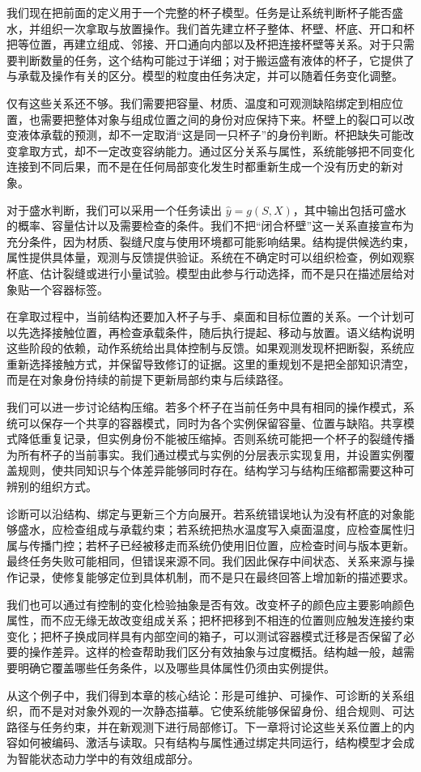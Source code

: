 我们现在把前面的定义用于一个完整的杯子模型。任务是让系统判断杯子能否盛水，并组织一次拿取与放置操作。我们首先建立杯子整体、杯壁、杯底、开口和杯把等位置，再建立组成、邻接、开口通向内部以及杯把连接杯壁等关系。对于只需要判断数量的任务，这个结构可能过于详细；对于搬运盛有液体的杯子，它提供了与承载及操作有关的区分。模型的粒度由任务决定，并可以随着任务变化调整。

仅有这些关系还不够。我们需要把容量、材质、温度和可观测缺陷绑定到相应位置，也需要把整体对象与组成位置之间的身份对应保持下来。杯壁上的裂口可以改变液体承载的预测，却不一定取消“这是同一只杯子”的身份判断。杯把缺失可能改变拿取方式，却不一定改变容纳能力。通过区分关系与属性，系统能够把不同变化连接到不同后果，而不是在任何局部变化发生时都重新生成一个没有历史的新对象。

对于盛水判断，我们可以采用一个任务读出 $\widehat y=g(S,X)$，其中输出包括可盛水的概率、容量估计以及需要检查的条件。我们不把“闭合杯壁”这一关系直接宣布为充分条件，因为材质、裂缝尺度与使用环境都可能影响结果。结构提供候选约束，属性提供具体量，观测与反馈提供验证。系统在不确定时可以组织检查，例如观察杯底、估计裂缝或进行小量试验。模型由此参与行动选择，而不是只在描述层给对象贴一个容器标签。

在拿取过程中，当前结构还要加入杯子与手、桌面和目标位置的关系。一个计划可以先选择接触位置，再检查承载条件，随后执行提起、移动与放置。语义结构说明这些阶段的依赖，动作系统给出具体控制与反馈。如果观测发现杯把断裂，系统应重新选择接触方式，并保留导致修订的证据。这里的重规划不是把全部知识清空，而是在对象身份持续的前提下更新局部约束与后续路径。

我们可以进一步讨论结构压缩。若多个杯子在当前任务中具有相同的操作模式，系统可以保存一个共享的容器模式，同时为各个实例保留容量、位置与缺陷。共享模式降低重复记录，但实例身份不能被压缩掉。否则系统可能把一个杯子的裂缝传播为所有杯子的当前事实。我们通过模式与实例的分层表示实现复用，并设置实例覆盖规则，使共同知识与个体差异能够同时存在。结构学习与结构压缩都需要这种可辨别的组织方式。

诊断可以沿结构、绑定与更新三个方向展开。若系统错误地认为没有杯底的对象能够盛水，应检查组成与承载约束；若系统把热水温度写入桌面温度，应检查属性归属与传播门控；若杯子已经被移走而系统仍使用旧位置，应检查时间与版本更新。最终任务失败可能相同，但错误来源不同。我们因此保存中间状态、关系来源与操作记录，使修复能够定位到具体机制，而不是只在最终回答上增加新的描述要求。

我们也可以通过有控制的变化检验抽象是否有效。改变杯子的颜色应主要影响颜色属性，而不应无缘无故改变组成关系；把杯把移到不相连的位置则应触发连接约束变化；把杯子换成同样具有内部空间的箱子，可以测试容器模式迁移是否保留了必要的操作差异。这样的检查帮助我们区分有效抽象与过度概括。结构越一般，越需要明确它覆盖哪些任务条件，以及哪些具体属性仍须由实例提供。

从这个例子中，我们得到本章的核心结论：形是可维护、可操作、可诊断的关系组织，而不是对对象外观的一次静态描摹。它使系统能够保留身份、组合规则、可达路径与任务约束，并在新观测下进行局部修订。下一章将讨论这些关系位置上的内容如何被编码、激活与读取。只有结构与属性通过绑定共同运行，结构模型才会成为智能状态动力学中的有效组成部分。
